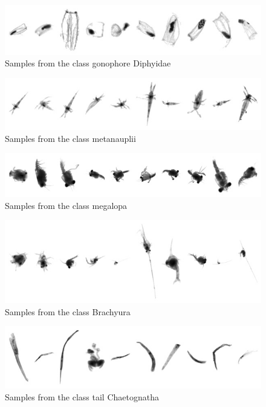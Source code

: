 \begin{figure}[h]
\includegraphics[width=\columnwidth]{collage/017_gonophore__Diphyidae.jpg}\caption{Samples from the class gonophore  Diphyidae }
\end{figure}
\begin{figure}[h]
\includegraphics[width=\columnwidth]{collage/018_metanauplii.jpg}\caption{Samples from the class metanauplii }
\end{figure}
\begin{figure}[h]
\includegraphics[width=\columnwidth]{collage/019_megalopa.jpg}\caption{Samples from the class megalopa }
\end{figure}
\begin{figure}[h]
\includegraphics[width=\columnwidth]{collage/020_Brachyura.jpg}\caption{Samples from the class Brachyura }
\end{figure}
\begin{figure}[h]
\includegraphics[width=\columnwidth]{collage/021_tail__Chaetognatha.jpg}\caption{Samples from the class tail  Chaetognatha }
\end{figure}
